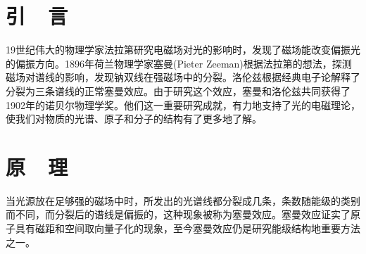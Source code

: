 \documentclass{buaaemp}
\begin{document}



\wuhao 

\section{引~~言}
19世纪伟大的物理学家法拉第研究电磁场对光的影响时，发现了磁场能改变偏振光的偏振方向。1896年荷兰物理学家塞曼(Pieter Zeeman)根据法拉第的想法，探测磁场对谱线的影响，发现钠双线在强磁场中的分裂。洛伦兹根据经典电子论解释了分裂为三条谱线的正常塞曼效应。由于研究这个效应，塞曼和洛伦兹共同获得了1902年的诺贝尔物理学奖。他们这一重要研究成就，有力地支持了光的电磁理论，使我们对物质的光谱、原子和分子的结构有了更多地了解。\cite{钱建强2016近代物理实验}

\section{原~~理}
当光源放在足够强的磁场中时，所发出的光谱线都分裂成几条，条数随能级的类别而不同，而分裂后的谱线是偏振的，这种现象被称为塞曼效应。塞曼效应证实了原子具有磁距和空间取向量子化的现象，至今塞曼效应仍是研究能级结构地重要方法之一。
\end{document}

